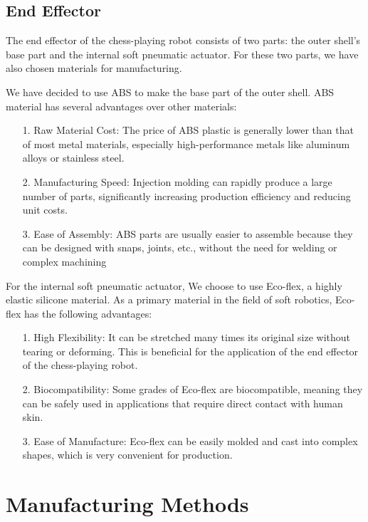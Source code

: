 \documentclass[10pt, a4paper, twocolumn]{article}
\begin{document}
\subsection{End Effector}
The end effector of the chess-playing robot consists of two parts: the outer shell's base part and the internal soft pneumatic actuator. For these two parts, we have also chosen materials for manufacturing.

We have decided to use ABS to make the base part of the outer shell. ABS material has several advantages over other materials:
\begin{itemize}
    \item [1.] Raw Material Cost: The price of ABS plastic is generally lower than that of most metal materials, especially high-performance metals like aluminum alloys or stainless steel.
    \item [2.] Manufacturing Speed: Injection molding can rapidly produce a large number of parts, significantly increasing production efficiency and reducing unit costs.
    \item [3.] Ease of Assembly: ABS parts are usually easier to assemble because they can be designed with snaps, joints, etc., without the need for welding or complex machining
\end{itemize}

For the internal soft pneumatic actuator, We choose to use Eco-flex, a highly elastic silicone material. As a primary material in the field of soft robotics, Eco-flex has the following advantages:

\begin{itemize}
    \item [1.] High Flexibility: It can be stretched many times its original size without tearing or deforming. This is beneficial for the application of the end effector of the chess-playing robot.
    \item [2.] Biocompatibility: Some grades of Eco-flex are biocompatible, meaning they can be safely used in applications that require direct contact with human skin.
    \item [3.] Ease of Manufacture: Eco-flex can be easily molded and cast into complex shapes, which is very convenient for production. 
\end{itemize}

\section{Manufacturing Methods}
\end{document}
